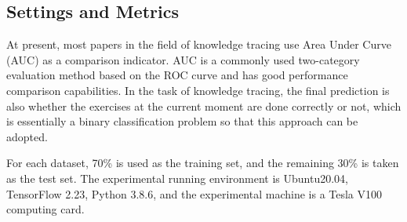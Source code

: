 \subsection{Settings and Metrics}
At present, most papers in the field of knowledge tracing use Area Under Curve (AUC) as a comparison indicator. AUC is a commonly used two-category evaluation method based on the ROC curve and has good performance comparison capabilities. In the task of knowledge tracing, the final prediction is also whether the exercises at the current moment are done correctly or not, which is essentially a binary classification problem so that this approach can be adopted.

For each dataset, 70\% is used as the training set, and the remaining 30\% is taken as the test set. The experimental running environment is Ubuntu20.04, TensorFlow 2.23, Python 3.8.6, and the experimental machine is a Tesla V100 computing card.

